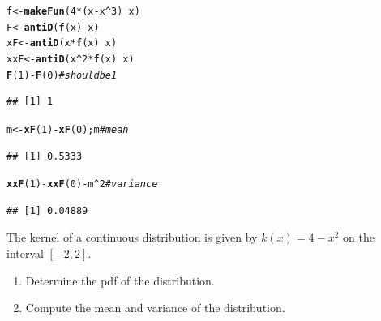 \documentclass[twoside]{book}\usepackage[]{graphicx}\usepackage[]{xcolor}
\makeatletter
\newcommand{\hlnum}[1]{\textcolor[rgb]{0.686,0.059,0.569}{#1}}%
\newcommand{\hlcom}[1]{\textcolor[rgb]{0.678,0.584,0.686}{\textit{#1}}}%
\newcommand{\hlopt}[1]{\textcolor[rgb]{0,0,0}{#1}}%
\newcommand{\hlstd}[1]{\textcolor[rgb]{0.345,0.345,0.345}{#1}}%
\newcommand{\hlkwb}[1]{\textcolor[rgb]{0.69,0.353,0.396}{#1}}%
\newcommand{\hlkwd}[1]{\textcolor[rgb]{0.737,0.353,0.396}{\textbf{#1}}}%
\newenvironment{kframe}{%
 \def\at@end@of@kframe{}%
 \ifinner\ifhmode%
  \def\at@end@of@kframe{\end{minipage}}%
  \begin{minipage}{\columnwidth}%
 \fi\fi%
 \def\FrameCommand##1{\hskip\@totalleftmargin \hskip-\fboxsep
 \colorbox{shadecolor}{##1}\hskip-\fboxsep
     \hskip-\linewidth \hskip-\@totalleftmargin \hskip\columnwidth}%
 \MakeFramed {\advance\hsize-\width
   \@totalleftmargin\z@ \linewidth\hsize
   \@setminipage}}%
 {\par\unskip\endMakeFramed%
 \at@end@of@kframe}
\newenvironment{knitrout}{}{} %
\makeatother
\begin{document}
\begin{solution}
\begin{knitrout}
\color{fgcolor}\begin{kframe}
\begin{alltt}
  \hlstd{f} \hlkwb{<-} \hlkwd{makeFun}\hlstd{(}\hlnum{4}\hlopt{*}\hlstd{(x}\hlopt{-}\hlstd{x}\hlopt{^}\hlnum{3}\hlstd{)} \hlopt{~} \hlstd{x)}
  \hlstd{F} \hlkwb{<-} \hlkwd{antiD}\hlstd{(}\hlkwd{f}\hlstd{(x)} \hlopt{~} \hlstd{x)}
 \hlstd{xF} \hlkwb{<-} \hlkwd{antiD}\hlstd{(x} \hlopt{*} \hlkwd{f}\hlstd{(x)} \hlopt{~} \hlstd{x)}
\hlstd{xxF} \hlkwb{<-} \hlkwd{antiD}\hlstd{(x}\hlopt{^}\hlnum{2} \hlopt{*} \hlkwd{f}\hlstd{(x)} \hlopt{~} \hlstd{x)}
\hlkwd{F}\hlstd{(}\hlnum{1}\hlstd{)} \hlopt{-} \hlkwd{F}\hlstd{(}\hlnum{0}\hlstd{)}                   \hlcom{# should be 1}
\end{alltt}
\begin{verbatim}
## [1] 1
\end{verbatim}
\begin{alltt}
\hlstd{m} \hlkwb{<-} \hlkwd{xF}\hlstd{(}\hlnum{1}\hlstd{)} \hlopt{-} \hlkwd{xF}\hlstd{(}\hlnum{0}\hlstd{); m}         \hlcom{# mean}
\end{alltt}
\begin{verbatim}
## [1] 0.5333
\end{verbatim}
\begin{alltt}
\hlkwd{xxF}\hlstd{(}\hlnum{1}\hlstd{)} \hlopt{-} \hlkwd{xxF}\hlstd{(}\hlnum{0}\hlstd{)} \hlopt{-} \hlstd{m}\hlopt{^}\hlnum{2}         \hlcom{# variance}
\end{alltt}
\begin{verbatim}
## [1] 0.04889
\end{verbatim}
\end{kframe}
\end{knitrout}
\end{solution}
	

\begin{problem}
The kernel of a continuous distribution is given by $k(x) = 4-x^2$
on the interval $[-2,2]$.  
\begin{enumerate}
	\item
		Determine the pdf of the distribution.
	\item
		Compute the mean and variance of the distribution.
\end{enumerate}
\newpage
\end{problem}
\end{document}
